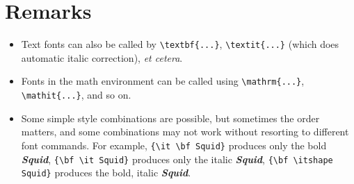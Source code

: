 \documentclass{article}
\begin{document}
\section*{Remarks}

\begin{itemize}

\item Text fonts can also be called by \verb|\textbf{...}|, 
\verb|\textit{...}| (which does automatic italic correction), 
{\it et cetera}.  

\item Fonts in the math environment can be called using
\verb|\mathrm{...}|, \verb|\mathit{...}|, and so on.  

\item Some simple style combinations are possible, but sometimes 
the order matters, and some combinations may not work without 
resorting to different font commands.  For example, 
\verb|{\it \bf Squid}| produces only the bold {\it \bf Squid}, 
\verb|{\bf \it Squid}| produces only the italic {\bf \it Squid},
\verb|{\bf \itshape Squid}| produces the bold, italic {\bf \itshape Squid}.

\end{itemize}
\end{document}
